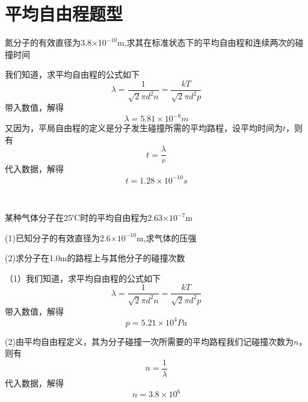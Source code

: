 \documentclass[lang=cn,10pt]{elegantbook}
\begin{document}
	\section{平均自由程题型}
	\begin{example}
		氮分子的有效直径为3.8$\times$1$0^{-10}$m,求其在标准状态下的平均自由程和连续两次的碰撞时间
	\end{example}
	\begin{solution}
		我们知道，求平均自由程的公式如下
		\begin{equation*}
			\lambda=\frac{1}{\sqrt{2}\pi d^{2}n}=\frac{kT}{\sqrt{2}\pi d^{2}p}
		\end{equation*}
		带入数值，解得
		\begin{equation*}
			\lambda=5.81\times10^{-8}m
		\end{equation*}
		又因为，平局自由程的定义是分子发生碰撞所需的平均路程，设平均时间为$t$，则有
		\begin{equation*}
			t=\frac{\lambda}{\overline{v}}
		\end{equation*}
		代入数据，解得
		\begin{equation*}
			t=1.28\times 10^{-10}s
		\end{equation*}
	\end{solution}
	~\\
	\begin{example}
		某种气体分子在25℃时的平均自由程为2.63$\times 10^{-7}$m
		
		(1)已知分子的有效直径为2.6$\times 10^{-10}$m,求气体的压强
		
		(2)求分子在1.0m的路程上与其他分子的碰撞次数
	\end{example}
	\begin{solution}
		（1）我们知道，求平均自由程的公式如下
			\begin{equation*}
			\lambda=\frac{1}{\sqrt{2}\pi d^{2}n}=\frac{kT}{\sqrt{2}\pi d^{2}p}
		\end{equation*}
		带入数值，解得
		\begin{equation*}
			p=5.21\times10^{4}Pa
		\end{equation*}
		
		(2)由平均自由程定义，其为分子碰撞一次所需要的平均路程我们记碰撞次数为$n$，则有
		\begin{equation*}
			n=\frac{1}{\lambda}
		\end{equation*}
		代入数据，解得
		\begin{equation*}
			n=3.8\times10^{6}
		\end{equation*}
	\end{solution}
\end{document}
